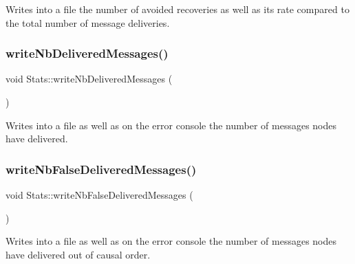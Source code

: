Writes into a file the number of avoided recoveries as well as its rate compared to the total number of message deliveries. 

\mbox{\label{class_stats_afff16579776ca8a5e5dbc4483689c2e4}} 
\subsubsection{\texorpdfstring{write\+Nb\+Delivered\+Messages()}{writeNbDeliveredMessages()}}
{\footnotesize\ttfamily void Stats\+::write\+Nb\+Delivered\+Messages (\begin{DoxyParamCaption}{ }\end{DoxyParamCaption})\hspace{0.3cm}{\ttfamily [private]}}



Writes into a file as well as on the error console the number of messages nodes have delivered. 

\mbox{\label{class_stats_a45fda4fde87dda93eaa44357d077d48c}} 
\subsubsection{\texorpdfstring{write\+Nb\+False\+Delivered\+Messages()}{writeNbFalseDeliveredMessages()}}
{\footnotesize\ttfamily void Stats\+::write\+Nb\+False\+Delivered\+Messages (\begin{DoxyParamCaption}{ }\end{DoxyParamCaption})\hspace{0.3cm}{\ttfamily [private]}}



Writes into a file as well as on the error console the number of messages nodes have delivered out of causal order. 

\mbox{\label{class_stats_ae91ab66504445b9e703966b505a55eaa}} 
